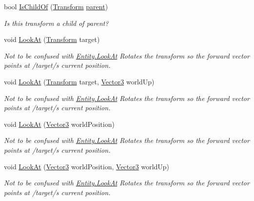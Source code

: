 \begin{DoxyCompactItemize}
bool \mbox{\hyperlink{class_lua_1_1_transform_ad11ff475738f907fdbdc4009c81ee09e}{Is\+Child\+Of}} (\mbox{\hyperlink{class_lua_1_1_transform}{Transform}} \mbox{\hyperlink{class_lua_1_1_transform_a8b6f784d7b29fbff37daec2e2001d991}{parent}})
\begin{DoxyCompactList}\small\item\em Is this transform a child of parent? \end{DoxyCompactList}\item 
void \mbox{\hyperlink{class_lua_1_1_transform_a1e722de9c3eacff82477ab7684a67553}{Look\+At}} (\mbox{\hyperlink{class_lua_1_1_transform}{Transform}} target)
\begin{DoxyCompactList}\small\item\em Not to be confused with \mbox{\hyperlink{class_lua_1_1_entity_a29cdb052c5422873a708c8080039cb4b}{Entity.\+Look\+At}} Rotates the transform so the forward vector points at /target/\textquotesingle{}s current position. \end{DoxyCompactList}\item 
void \mbox{\hyperlink{class_lua_1_1_transform_acab4e79308fc20ffa13f6048b7cb3184}{Look\+At}} (\mbox{\hyperlink{class_lua_1_1_transform}{Transform}} target, \mbox{\hyperlink{class_lua_1_1_vector3}{Vector3}} world\+Up)
\begin{DoxyCompactList}\small\item\em Not to be confused with \mbox{\hyperlink{class_lua_1_1_entity_a29cdb052c5422873a708c8080039cb4b}{Entity.\+Look\+At}} Rotates the transform so the forward vector points at /target/\textquotesingle{}s current position. \end{DoxyCompactList}\item 
void \mbox{\hyperlink{class_lua_1_1_transform_aa8630c1feef1c89cf7a201f6c92005ee}{Look\+At}} (\mbox{\hyperlink{class_lua_1_1_vector3}{Vector3}} world\+Position)
\begin{DoxyCompactList}\small\item\em Not to be confused with \mbox{\hyperlink{class_lua_1_1_entity_a29cdb052c5422873a708c8080039cb4b}{Entity.\+Look\+At}} Rotates the transform so the forward vector points at /target/\textquotesingle{}s current position. \end{DoxyCompactList}\item 
void \mbox{\hyperlink{class_lua_1_1_transform_a9364734c07f954378c167f7f5258fa18}{Look\+At}} (\mbox{\hyperlink{class_lua_1_1_vector3}{Vector3}} world\+Position, \mbox{\hyperlink{class_lua_1_1_vector3}{Vector3}} world\+Up)
\begin{DoxyCompactList}\small\item\em Not to be confused with \mbox{\hyperlink{class_lua_1_1_entity_a29cdb052c5422873a708c8080039cb4b}{Entity.\+Look\+At}} Rotates the transform so the forward vector points at /target/\textquotesingle{}s current position. \end{DoxyCompactList}\item 

\end{DoxyCompactItemize}
